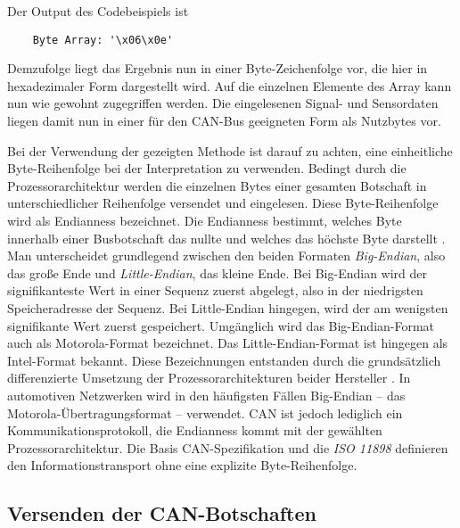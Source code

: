 Der Output des Codebeispiels ist
\begin{addmargin}[1cm]{0cm} 
	\begin{verbatim}
	Byte Array: '\x06\x0e'
	\end{verbatim}
\end{addmargin}

Demzufolge liegt das Ergebnis nun in einer Byte-Zeichenfolge vor, die hier in hexadezimaler Form dargestellt wird. Auf die einzelnen Elemente des Array kann nun wie gewohnt zugegriffen werden. Die eingelesenen Signal- und Sensordaten liegen damit nun in einer für den CAN-Bus geeigneten Form als Nutzbytes vor. 

Bei der Verwendung der gezeigten Methode ist darauf zu achten, eine einheitliche Byte-Reihenfolge bei der Interpretation zu verwenden. Bedingt durch die Prozessorarchitektur werden die einzelnen Bytes einer gesamten Botschaft in unterschiedlicher Reihenfolge versendet und eingelesen. Diese Byte-Reihenfolge wird als Endianness bezeichnet. Die Endianness bestimmt, welches Byte innerhalb einer Busbotschaft das nullte und welches das höchste Byte darstellt \cite{FordMotorCompany.2017}. Man unterscheidet grundlegend zwischen den beiden Formaten \emph{Big-Endian}, also das große Ende und \emph{Little-Endian}, das kleine Ende. Bei Big-Endian wird der signifikanteste Wert in einer Sequenz zuerst abgelegt, also in der niedrigsten Speicheradresse der Sequenz. Bei Little-Endian hingegen, wird der am wenigsten signifikante Wert zuerst gespeichert. Umgänglich wird das Big-Endian-Format auch als Motorola-Format bezeichnet. Das Little-Endian-Format ist hingegen als Intel-Format bekannt. Diese Bezeichnungen entstanden durch die grundsätzlich differenzierte Umsetzung der Prozessorarchitekturen beider Hersteller \cite{Rouse.2014}. In automotiven Netzwerken wird in den häufigsten Fällen Big-Endian – das Motorola-Übertragungsformat – verwendet. CAN ist jedoch lediglich ein Kommunikationsprotokoll, die Endianness kommt mit der gewählten Prozessorarchitektur. Die Basis CAN-Spezifikation und die \emph{ISO 11898} definieren den Informationstransport ohne eine explizite Byte-Reihenfolge.


\subsection{Versenden der CAN-Botschaften} \label{subsec:VersendenCAN-Botschaten}


